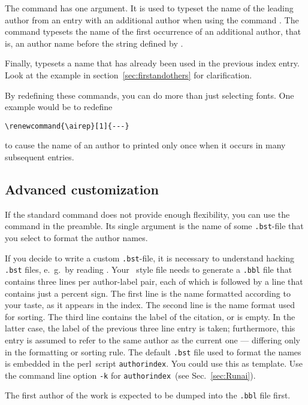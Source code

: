 \documentclass[a4paper]{article}
\newcommand{\perl}{\textsf{perl}}
\newcommand{\file}[1]{\texttt{#1}}
\newcommand{\fnext}[1]{\file{.#1}}
\newcommand{\cmdline}[1]{\texttt{#1}}
\newcommand{\option}[1]{\cmdline{#1}}
\newcommand{\aiperl}{\cmdline{authorindex}}
\newcommand{\ltxinp}[1]{\texttt{\string#1}}
\begin{document}
The command \ltxinp{\aifirst} has one argument.  It is used to typeset the name
of the leading author from an entry with an additional author when using the
command \ltxinp{\aisee}. The command \ltxinp{\aitop} typesets the name of the
first occurrence of an additional author, that is, an author name before the
string defined by \ltxinp{\aisee}.

Finally, \ltxinp{\airep} typesets a name that has already been used in the
previous index entry.  Look at the example in section~\ref{sec:firstandothers}
for clarification.

By redefining these commands, you can do more than just selecting fonts.  One
example would be to redefine
\begin{verbatim}
\renewcommand{\airep}[1]{---}
\end{verbatim}
to cause the name of an author to printed only once when it occurs in many
subsequent entries.


\subsection{Advanced customization}
\label{sec:bsthacker}

If the standard command \ltxinp{\ainamefmt} does not provide enough
flexibility, you can use the command \ltxinp{\authorindexstyle} in the
preamble. Its single argument is the name of some \fnext{bst}-file that you
select to format the author names.

If you decide to write a custom \fnext{bst}-file, it is necessary to understand
hacking \fnext{bst} files, e.~g.\ by reading \cite{Patashnik88b}. Your \BibTeX\
style file needs to generate a \fnext{bbl} file that contains three lines per
author-label pair, each of which is followed by a line that contains just a
percent sign.  The first line is the name formatted according to your taste, as
it appears in the index.  The second line is the name format used for
sorting. The third line contains the label of the citation, or is empty.  In
the latter case, the label of the previous three line entry is taken;
furthermore, this entry is assumed to refer to the same author as the current
one --- differing only in the formatting or sorting rule. The default
\fnext{bst} file used to format the names is embedded in the \perl\ script
\aiperl. You could use this as template. Use the command line option
\option{-k} for \aiperl\ (see Sec.~\ref{sec:Runai}).

The first author of the work is expected to be dumped into the \fnext{bbl} file
first.
\end{document}
